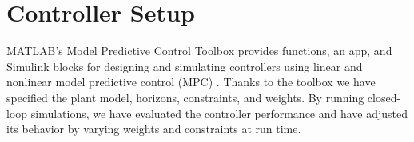 \section{Controller Setup}
\label{chap:Controller}



MATLAB's Model Predictive Control Toolbox provides functions, an app, and Simulink blocks for designing and simulating controllers using linear and nonlinear model predictive control (MPC) \cite{MPCToolbox}. Thanks to the toolbox we have specified the plant model, horizons, constraints, and weights. By running closed-loop simulations, we have evaluated the controller performance and have adjusted its behavior by varying weights and constraints at run time.

